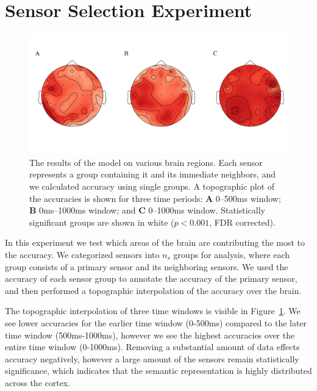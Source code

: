 \section{Sensor Selection Experiment}

\begin{figure}[t]
  \centering
  \includegraphics[width=0.9\linewidth]{figures/topographic}
  \caption[Topographic Analysis of \tvt Accuracy]{
    The results of the model on various brain regions. Each sensor represents a 
    group containing it and its immediate neighbors, and we calculated \tvt 
    accuracy using single groups.  A topographic plot of the \tvt accuracies is 
    shown for three time periods: {\bf A}  0--500ms window; {\bf B} 0ms--1000ms 
    window; and {\bf C} 0--1000ms window. Statistically significant groups are 
    shown in white ($p < 0.001$, FDR corrected).
  }
  \label{fig:topographic}
\end{figure}


In this experiment we test which areas of the brain are contributing the most 
to the \tvt accuracy. We categorized sensors into $n_s$ groups for analysis, 
where each group consists of a primary sensor and its neighboring sensors. We 
used the accuracy of each sensor group to annotate the accuracy of the primary 
sensor, and then performed a topographic interpolation of the \tvt accuracy 
over the brain. 

The topographic interpolation of three time windows is visible in 
Figure~\ref{fig:topographic}. We see lower \tvt accuracies for the earlier time 
window (0-500ms) compared to the later time window (500ms-1000ms), however we 
see the highest accuracies over the entire time window (0-1000ms). Removing a 
substantial amount of data effects accuracy negatively, however a large amount 
of the sensors remain statistically significance, which indicates that the 
semantic representation is highly distributed across the cortex.

